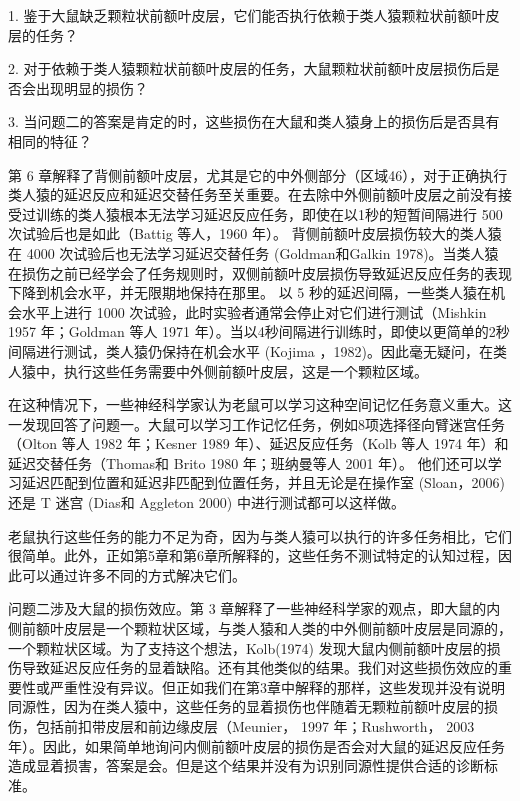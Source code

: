 \par 
1. 鉴于大鼠缺乏颗粒状前额叶皮层，它们能否执行依赖于类人猿颗粒状前额叶皮层的任务？ 
\par 
2. 对于依赖于类人猿颗粒状前额叶皮层的任务，大鼠颗粒状前额叶皮层损伤后是否会出现明显的损伤？
\par 
3. 当问题二的答案是肯定的时，这些损伤在大鼠和类人猿身上的损伤后是否具有相同的特征？
\par 
第 6 章解释了背侧前额叶皮层，尤其是它的中外侧部分（区域46），对于正确执行类人猿的延迟反应和延迟交替任务至关重要。在去除中外侧前额叶皮层之前没有接受过训练的类人猿根本无法学习延迟反应任务，即使在以1秒的短暂间隔进行 500 次试验后也是如此（Battig 等人，1960 年）。 背侧前额叶皮层损伤较大的类人猿在 4000 次试验后也无法学习延迟交替任务 (Goldman和Galkin 1978)。当类人猿在损伤之前已经学会了任务规则时，双侧前额叶皮层损伤导致延迟反应任务的表现下降到机会水平，并无限期地保持在那里。 以 5 秒的延迟间隔，一些类人猿在机会水平上进行 1000 次试验，此时实验者通常会停止对它们进行测试（Mishkin 1957 年；Goldman 等人 1971 年）。当以4秒间隔进行训练时，即使以更简单的2秒间隔进行测试，类人猿仍保持在机会水平 (Kojima ，1982)。因此毫无疑问，在类人猿中，执行这些任务需要中外侧前额叶皮层，这是一个颗粒区域。
\par 
在这种情况下，一些神经科学家认为老鼠可以学习这种空间记忆任务意义重大。这一发现回答了问题一。大鼠可以学习工作记忆任务，例如8项选择径向臂迷宫任务（Olton 等人 1982 年；Kesner 1989 年）、延迟反应任务（Kolb 等人 1974 年）和延迟交替任务（Thomas和 Brito 1980 年；班纳曼等人 2001 年）。 他们还可以学习延迟匹配到位置和延迟非匹配到位置任务，并且无论是在操作室 (Sloan，2006) 还是 T 迷宫 (Dias和 Aggleton 2000) 中进行测试都可以这样做。
\par 
老鼠执行这些任务的能力不足为奇，因为与类人猿可以执行的许多任务相比，它们很简单。此外，正如第5章和第6章所解释的，这些任务不测试特定的认知过程，因此可以通过许多不同的方式解决它们。
\par 
问题二涉及大鼠的损伤效应。第 3 章解释了一些神经科学家的观点，即大鼠的内侧前额叶皮层是一个颗粒状区域，与类人猿和人类的中外侧前额叶皮层是同源的，一个颗粒状区域。为了支持这个想法，Kolb(1974) 发现大鼠内侧前额叶皮层的损伤导致延迟反应任务的显着缺陷。还有其他类似的结果。我们对这些损伤效应的重要性或严重性没有异议。但正如我们在第3章中解释的那样，这些发现并没有说明同源性，因为在类人猿中，这些任务的显着损伤也伴随着无颗粒前额叶皮层的损伤，包括前扣带皮层和前边缘皮层（Meunier， 1997 年；Rushworth， 2003 年）。因此，如果简单地询问内侧前额叶皮层的损伤是否会对大鼠的延迟反应任务造成显着损害，答案是会。但是这个结果并没有为识别同源性提供合适的诊断标准。
